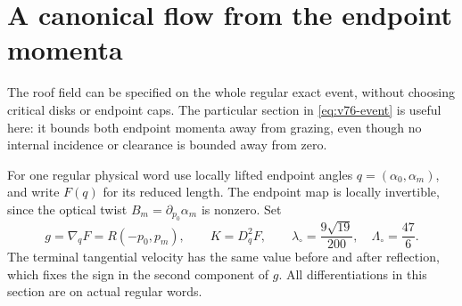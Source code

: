 \section{A canonical flow from the endpoint momenta}
\label{sec:v77-canonical}
The roof field can be specified on the whole regular exact event,
without choosing critical disks or endpoint caps. The particular
section in \eqref{eq:v76-event} is useful here: it bounds both endpoint
momenta away from grazing, even though no internal incidence or
clearance is bounded away from zero.

For one regular physical word use locally lifted endpoint angles
$q=(\alpha_0,\alpha_m)$, and write $F(q)$ for its reduced length.
The endpoint map is locally invertible, since the optical twist
$B_m=\partial_{p_0}\alpha_m$ is nonzero. Set
\[
 g=\nabla_qF=R(-p_0,p_m),\qquad K=D_q^2F,
 \qquad \lambda_\circ=\frac{9\sqrt{19}}{200},\quad
 \Lambda_\circ=\frac{47}{6}.
\]
The terminal tangential velocity has the same value before and after
reflection, which fixes the sign in the second component of $g$.
All differentiations in this section are on actual regular words.

